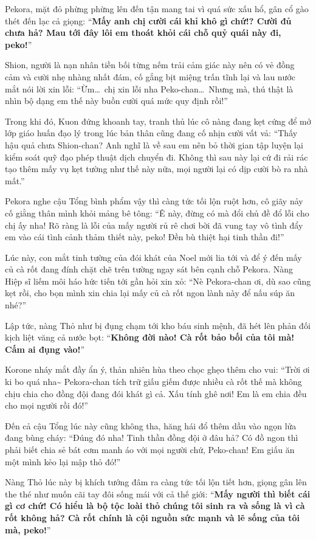 \documentclass[../main.tex]{subfiles}
\begin{document}
Pekora, mặt đỏ phừng phừng lên đến tận mang tai vì quá sức xấu hổ, gân cổ gào thét đến lạc cả giọng: ``\textbf{Mấy anh chị cười cái khỉ khô gì chứ!? Cười đủ chưa hả? Mau tới đây lôi em thoát khỏi cái chỗ quỷ quái này đi, peko!}''

Shion, người là nạn nhân tiền bối từng nếm trải cảm giác này nên có vẻ đồng cảm và cười nhẹ nhàng nhất đám, cố gắng bịt miệng trấn tĩnh lại và lau nước mắt nói lời xin lỗi: ``Ừm\dots\ chị xin lỗi nha Peko-chan\dots\ Nhưng mà, thú thật là nhìn bộ dạng em thế này buồn cười quá mức quy định rồi!''

Trong khi đó, Kuon đứng khoanh tay, tranh thủ lúc cô nàng đang kẹt cứng để mở lớp giáo huấn đạo lý trong lúc bản thân cũng đang cố nhịn cười vất vả: ``Thấy hậu quả chưa Shion-chan? Anh nghĩ là về sau em nên bỏ thời gian tập luyện lại kiểm soát quỹ đạo phép thuật dịch chuyển đi. Không thì sau này lại cứ đi rải rác tạo thêm mấy vụ kẹt tường như thế này nữa, mọi người lại có dịp cười bò ra nhà mất.''

Pekora nghe cậu Tổng bình phẩm vậy thì càng tức tối lộn ruột hơn, cô giãy nảy cố giằng thân mình khỏi mảng bê tông: ``Ê này, đừng có mà đổi chủ đề đổ lỗi cho chị ấy nha! Rõ ràng là lỗi của mấy người rủ rê chơi bời đã vung tay vô tình đẩy em vào cái tình cảnh thảm thiết này, peko! Đền bù thiệt hại tinh thần đi!''

Lúc này, con mắt tinh tường của đói khát của Noel mới lia tới và để ý đến mấy củ cà rốt đang đính chặt chẽ trên tường ngay sát bên cạnh chỗ Pekora. Nàng Hiệp sĩ liếm môi háo hức tiến tới gần hỏi xin xỏ: ``Nè Pekora-chan ơi, dù sao cũng kẹt rồi, cho bọn mình xin chia lại mấy củ cà rốt ngon lành này để nấu súp ăn nhé?''

Lập tức, nàng Thỏ như bị đụng chạm tới kho báu sinh mệnh, đã hét lên phản đối kịch liệt văng cả nước bọt: ``\textbf{Không đời nào! Cà rốt bảo bối của tôi mà! Cấm ai đụng vào!}''

Korone nháy mắt đầy ẩn ý, thản nhiên hùa theo chọc ghẹo thêm cho vui: ``Trời ơi ki bo quá nha\~{} Pekora-chan tích trữ giấu giếm được nhiều cà rốt thế mà không chịu chia cho đồng đội đang đói khát gì cả. Xấu tính ghê nơi! Em là em chia đều cho mọi người rồi đó!''

Đến cả cậu Tổng lúc này cũng không tha, hăng hái đổ thêm dầu vào ngọn lửa đang bùng cháy: ``Đúng đó nha! Tinh thần đồng đội ở đâu hả? Có đồ ngon thì phải biết chia sẻ bát cơm manh áo với mọi người chứ, Peko-chan! Em giấu ăn một mình kẻo lại mập thỏ đó!''

Nàng Thỏ lúc này bị khích tướng đâm ra càng tức tối lộn tiết hơn, giọng gân lên the thé như muốn cãi tay đôi sống mái với cả thế giới: ``\textbf{Mấy người thì biết cái gì cơ chứ! Có hiểu là bộ tộc loài thỏ chúng tôi sinh ra và sống là vì cà rốt không hả? Cà rốt chính là cội nguồn sức mạnh và lẽ sống của tôi mà, peko!}''
\end{document}

